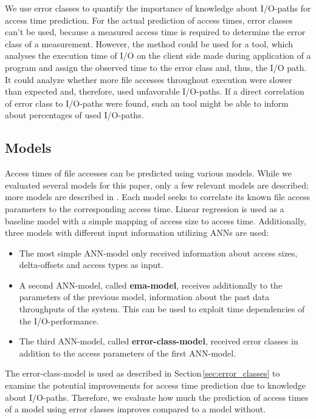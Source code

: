 \documentclass{superfri}
\begin{document}
\medskip

We use error classes to quantify the importance of knowledge about I/O-paths for access time prediction. 
For the actual prediction of access times, error classes can't be used, because a measured access time is required to determine the error class of a measurement.
However, the method could be used for a tool, which analyses the execution time of I/O on the client side made during application of a program and assign the observed time to the error class and, thus, the I/O path. 
It could analyze whether more file accesses throughout execution were slower than expected and, therefore, used unfavorable I/O-paths.
If a direct correlation of error class to I/O-paths were found, such an tool might be able to inform about percentages of used I/O-paths.

\subsection{Models}
Access times of file accesses can be predicted using various models.
While we evaluated several models for this paper, only a few relevant models are described; more models are described in \cite{VVEIHUDVVN15}. 
Each model seeks to correlate its known file access parameters to the corresponding access time. 
Linear regression is used as a baseline model with a simple mapping of access size to access time.
Additionally, three models with different input information utilizing ANNs are used:
\begin{itemize}
	\item The most simple ANN-model only received information about access sizes, delta-offsets and access types as input.
	\item A second ANN-model, called \textbf{ema-model}, receives additionally to the parameters of the previous model,  information about the past data throughputs of the system. This can be used to exploit time dependencies of the I/O-performance.
	\item The third ANN-model, called \textbf{error-class-model}, received error classes in addition to the access parameters of the first ANN-model.
\end{itemize}\medskip

The error-class-model is used as described in Section\,\ref{sec:error_classes} to examine the potential improvements for access time prediction due to knowledge about I/O-paths.
Therefore, we evaluate how much the prediction of access times of a model using error classes improves compared to a model without.
\end{document}
